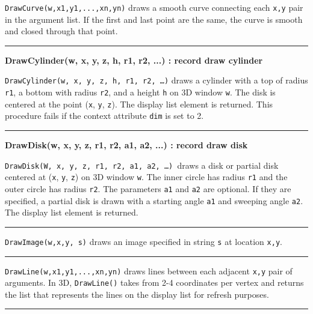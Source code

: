 \noindent
\texttt{DrawCurve(w,x1,y1,...,xn,yn)} draws a smooth curve connecting
each \texttt{x,y} pair in the argument list. If the first and last
point are the same, the curve is smooth and closed through that point.

\bigskip\hrule\vspace{0.1cm}
\noindent
{\bf DrawCylinder(w, x, y, z, h, r1, r2, ...) : record \hfill draw cylinder}

\noindent
\texttt{DrawCylinder(w, x, y, z, h, r1, r2, {\dots})} draws a cylinder
with a top of radius \texttt{r1}, a bottom with radius \texttt{r2}, and
a height \texttt{h} on 3D window \texttt{w}. The disk is centered at
the point (\texttt{x}, \texttt{y}, \texttt{z}). The display list
element is returned. This procedure fails if the context attribute
\texttt{dim} is set to 2.

\bigskip\hrule\vspace{0.1cm}
\noindent
{\bf DrawDisk(w, x, y, z, r1, r2, a1, a2, ...) : record \hfill draw disk}

\noindent
\texttt{DrawDisk(W, x, y, z, r1, r2, a1, a2, {\dots})}\texttt{ }draws a
disk or partial disk centered at (\texttt{x}, \texttt{y}, \texttt{z})
on 3D window \texttt{w}. The inner circle has radius \texttt{r1} and
the outer circle has radius \texttt{r2}. The parameters \texttt{a1} and
\texttt{a2} are optional. If they are specified, a partial disk is
drawn with a starting angle \texttt{a1} and sweeping angle \texttt{a2}.
The display list element is returned.

\bigskip\hrule\vspace{0.1cm}

\noindent
\texttt{DrawImage(w,x,y, s)} draws an image specified in string
\texttt{s} at location \texttt{x,y}.

\bigskip\hrule\vspace{0.1cm}

\noindent
\texttt{DrawLine(w,x1,y1,...,xn,yn)} draws lines between each adjacent
\texttt{x,y} pair of arguments. In 3D, \texttt{DrawLine()} takes from
2-4 coordinates per vertex and returns the list that represents the
lines on the display list for refresh purposes.

\bigskip\hrule\vspace{0.1cm}

